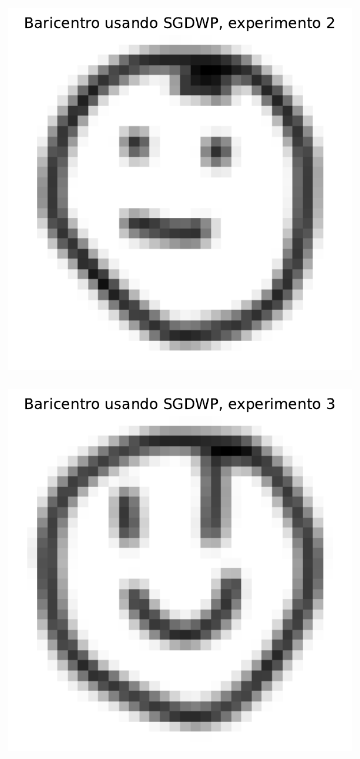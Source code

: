 \begin{figure}[H]
\begin{subfigure}[b]{0.17\textwidth}
        \includegraphics[width=\textwidth]{img/sgdwp/bar-SGDWP-exp-02.pdf}
        \label{fig:bar-SGDWP-exp-02}
    \end{subfigure}
    \hfill
    \begin{subfigure}[b]{0.17\textwidth}
        \centering
        \includegraphics[width=\textwidth]{img/sgdwp/bar-SGDWP-exp-03.pdf}

\end{subfigure}
\end{figure}
